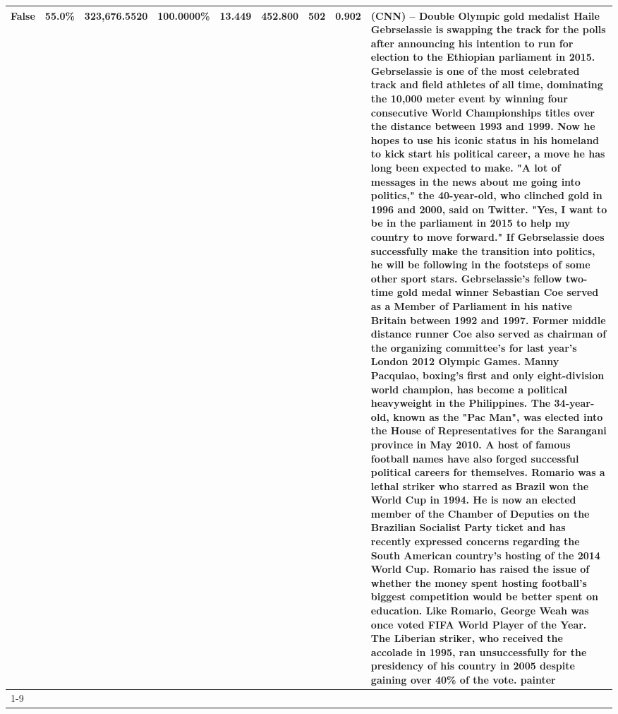 \begin{table}[H]
{\begin{tabular}{lllrlllll}
False & 55.0\% & 323,676.5520 & \bfseries \color{red} 100.0000\% & 13.449 & 452.800 & 502 & 0.902 & (CNN) -- Double Olympic gold medalist Haile Gebrselassie is swapping the track for the polls after announcing his intention to run for election to the Ethiopian parliament in 2015. Gebrselassie is one of the most celebrated track and field athletes of all time, dominating the 10,000 meter event by winning four consecutive World Championships titles over the distance between 1993 and 1999. Now he hopes to use his iconic status in his homeland to kick start his political career, a move he has long been expected to make. "A lot of messages in the news about me going into politics," the 40-year-old, who clinched gold in 1996 and 2000, said on Twitter. "Yes, I want to be in the parliament in 2015 to help my country to move forward." If Gebrselassie does successfully make the transition into politics, he will be following in the footsteps of some other sport stars. Gebrselassie's fellow two-time gold medal winner Sebastian Coe served as a Member of Parliament in his native Britain between 1992 and 1997. Former middle distance runner Coe also served as chairman of the organizing committee's for last year's London 2012 Olympic Games. Manny Pacquiao, boxing's first and only eight-division world champion, has become a political heavyweight in the Philippines. The 34-year-old, known as the "Pac Man", was elected into the House of Representatives for the Sarangani province in May 2010. A host of famous football names have also forged successful political careers for themselves. Romario was a lethal striker who starred as Brazil won the World Cup in 1994. He is now an elected member of the Chamber of Deputies on the Brazilian Socialist Party ticket and has recently expressed concerns regarding the South American country's hosting of the 2014 World Cup. Romario has raised the issue of whether the money spent hosting football's biggest competition would be better spent on education. Like Romario, George Weah was once voted FIFA World Player of the Year. The Liberian striker, who received the accolade in 1995, ran unsuccessfully for the presidency of his country in 2005 despite gaining over 40\% of the vote. painter \\
\cline{1-9}

\end{tabular}}
\end{table}
